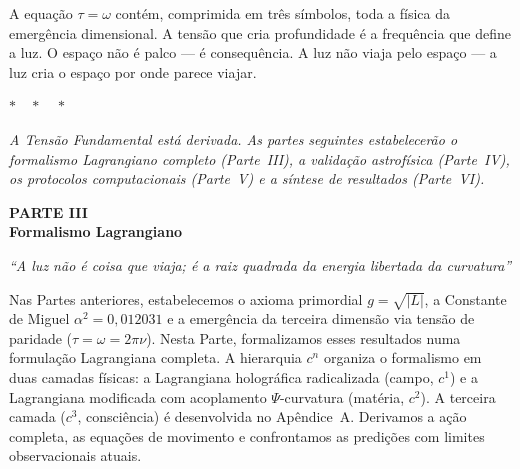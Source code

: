 \documentclass[12pt,a4paper,twoside]{article}
\newcommand{\alphaii}{\alpha^{2}}
\newcommand{\Psifield}{\Psi}
\begin{document}
\bigskip

A equa\c{c}\~ao $\tau = \omega$ cont\'em, comprimida em tr\^es s\'imbolos, toda a f\'isica da emerg\^encia dimensional. A tens\~ao que cria profundidade \'e a frequ\^encia que define a luz. O espa\c{c}o n\~ao \'e palco --- \'e consequ\^encia. A luz n\~ao viaja pelo espa\c{c}o --- a luz cria o espa\c{c}o por onde parece viajar.

\bigskip
\begin{center}
$\ast\quad\ast\quad\ast$
\end{center}
\bigskip

\noindent\textit{A Tens\~ao Fundamental est\'a derivada. As partes seguintes estabelecer\~ao o formalismo Lagrangiano completo (Parte~III), a valida\c{c}\~ao astrof\'isica (Parte~IV), os protocolos computacionais (Parte~V) e a s\'intese de resultados (Parte~VI).}



\setcounter{section}{0}
\renewcommand{\thesection}{III.\arabic{section}}
\renewcommand{\theequation}{III.\arabic{equation}}
\renewcommand{\theHsection}{III.\arabic{section}} %
\setcounter{footnote}{0}

\begin{center}
\vspace*{1cm}
{\huge\bfseries\color{tglblue} PARTE III}\\[0.5cm]
{\LARGE\bfseries\color{tglblue} Formalismo Lagrangiano}\\[0.3cm]
\vspace*{1cm}

{\large\itshape ``A luz n\~ao \'e coisa que viaja; \'e a raiz quadrada da energia libertada da curvatura''}\\[0.3cm]
\vspace*{1.5cm}
\end{center}

\noindent Nas Partes anteriores, estabelecemos o axioma primordial $g = \sqrt{|L|}$, a Constante de Miguel $\alphaii = 0{,}012031$ e a emerg\^encia da terceira dimens\~ao via tens\~ao de paridade ($\tau = \omega = 2\pi\nu$). Nesta Parte, formalizamos esses resultados numa formula\c{c}\~ao Lagrangiana completa. A hierarquia $c^n$ organiza o formalismo em duas camadas f\'isicas: a Lagrangiana hologr\'afica radicalizada (campo, $c^1$) e a Lagrangiana modificada com acoplamento $\Psifield$-curvatura (mat\'eria, $c^2$). A terceira camada ($c^3$, consci\^encia) \'e desenvolvida no Ap\^endice~A. Derivamos a a\c{c}\~ao completa, as equa\c{c}\~oes de movimento e confrontamos as predi\c{c}\~oes com limites observacionais atuais.
\end{document}
